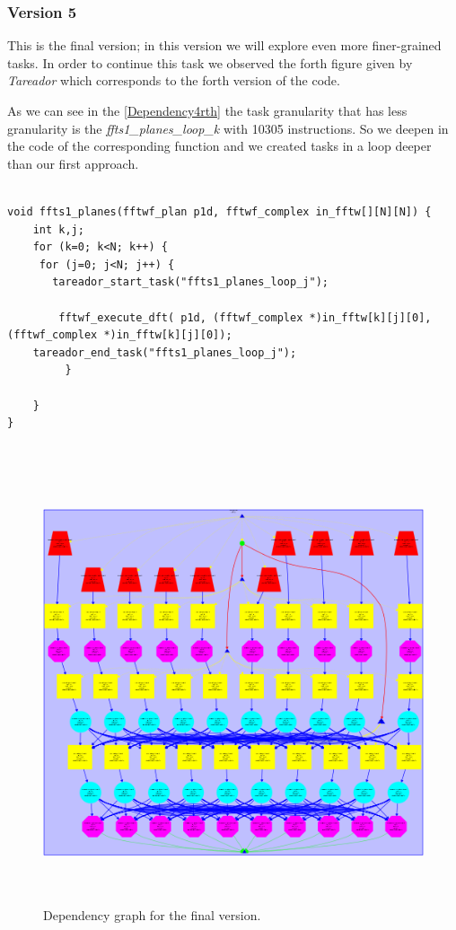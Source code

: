 \documentclass[12]{article}
\begin{document}
\subsubsection{Version 5}
This is the final version; in this version we will explore even more finer-grained tasks. In order to continue this task we observed the forth figure given by \textit{Tareador} which corresponds to the forth version of the code. 

As we can see in the \ref{Dependency4rth} the task granularity that has less granularity is the \textit{ffts1\_planes\_loop\_k} with 10305 instructions. So we deepen in the code of the corresponding function and we created tasks in a loop deeper than our first approach. 
\begin{lstlisting}

void ffts1_planes(fftwf_plan p1d, fftwf_complex in_fftw[][N][N]) {
    int k,j;
    for (k=0; k<N; k++) {
     for (j=0; j<N; j++) {
       tareador_start_task("ffts1_planes_loop_j");

        fftwf_execute_dft( p1d, (fftwf_complex *)in_fftw[k][j][0], (fftwf_complex *)in_fftw[k][j][0]);
    tareador_end_task("ffts1_planes_loop_j");
         }

    }
}


\end{lstlisting}
\bigskip

\begin{figure}[H]
\centering  \includegraphics[width=\linewidth , height=13cm, width=13cm  ]{images/dependency_graph4.png}
  \caption{Dependency graph for the final version.}
  \label{fig:Dependency5}
\end{figure}
\end{document}
